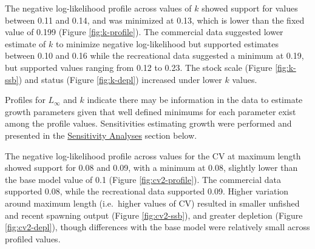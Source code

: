 \documentclass[11pt,
  english,
  letterpaper,
]{article}
\begin{document}
\leavevmode\tagmcend\tagstructend\par


The negative log-likelihood profile across values of {\(k\)\leavevmode\tagmcend\tagstructend} showed support for values between 0.11 and 0.14, and was minimized at 0.13, which is lower than the fixed value of 0.199 (Figure \ref{fig:k-profile}). The commercial data suggested lower estimate of {\(k\)\leavevmode\tagmcend\tagstructend} to minimize negative log-likelihood but supported estimates between 0.10 and 0.16 while the recreational data suggested a minimum at 0.19, but supported values ranging from 0.12 to 0.23. The stock scale (Figure \ref{fig:k-ssb}) and status (Figure \ref{fig:k-depl}) increased under lower {\(k\)\leavevmode\tagmcend\tagstructend} values.

\leavevmode\tagmcend\tagstructend\par


Profiles for {\(L_{\infty}\)\leavevmode\tagmcend\tagstructend} and {\(k\)\leavevmode\tagmcend\tagstructend} indicate there may be information in the data to estimate growth parameters given that well defined minimums for each parameter exist among the profile values. Sensitivities estimating growth were performed and presented in the {\protect\hyperlink{sensitivity-analyses}{Sensitivity Analyses}\leavevmode\tagmcend\tagstructend} section below.

\leavevmode\tagmcend\tagstructend\par


The negative log-likelihood profile across values for the CV at maximum length showed support for 0.08 and 0.09, with a minimum at 0.08, slightly lower than the base model value of 0.1 (Figure \ref{fig:cv2-profile}). The commercial data supported 0.08, while the recreational data supported 0.09. Higher variation around maximum length (i.e.~higher values of CV) resulted in smaller unfished and recent spawning output (Figure \ref{fig:cv2-ssb}), and greater depletion (Figure \ref{fig:cv2-depl}), though differences with the base model were relatively small across profiled values.
\end{document}
